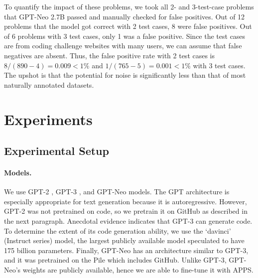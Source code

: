 \documentclass{article}
\begin{document}
To quantify the impact of these problems, we took all 2- and 3-test-case problems that GPT-Neo 2.7B passed and manually checked for false positives. Out of 12 problems that the model got correct with 2 test cases, 8 were false positives. Out of 6 problems with 3 test cases, only 1 was a false positive. Since the test cases are from coding challenge websites with many users, we can assume that false negatives are absent. Thus, the false positive rate with 2 test cases is $8/(890-4) = 0.009 < 1\%$ and $1/(765-5) = 0.001 < 1\%$ with 3 test cases. The upshot is that the potential for noise is significantly less than that of most naturally annotated datasets. \section{Experiments}







\subsection{Experimental Setup}







\paragraph{Models.}
We use GPT-2 \citep{radford2019language}, GPT-3 \citep{Brown2020LanguageMA}, and GPT-Neo \citep{gpt-neo} models. The GPT architecture is especially appropriate for text generation because it is autoregressive. However, GPT-2 was not pretrained on code, so we pretrain it on GitHub as described in the next paragraph. Anecdotal evidence indicates that GPT-3 can generate code. To determine the extent of its code generation ability, we use the `davinci' (Instruct series) model, the largest publicly available model speculated to have 175 billion parameters. Finally, GPT-Neo has an architecture similar to GPT-3, and it was pretrained on the Pile \citep{gao2020pile} which includes GitHub. Unlike GPT-3, GPT-Neo's weights are publicly available, hence we are able to fine-tune it with APPS.
\end{document}
